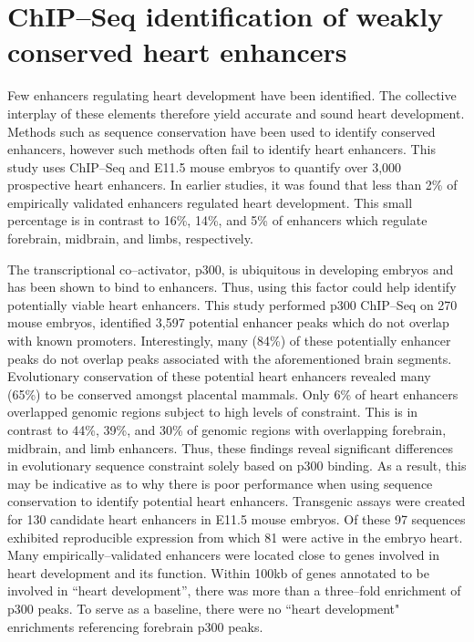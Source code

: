 \documentclass{article}
\begin{document}
	
\section*{ChIP--Seq identification of weakly conserved heart enhancers \cite{blow-naturegen-2010}}
	Few enhancers regulating heart development have been identified. The collective interplay of these
	elements therefore yield accurate and sound heart development. Methods such as sequence conservation have 
	been used to identify conserved enhancers, however such methods often fail to identify heart enhancers.
	This study uses ChIP--Seq and E11.5 mouse embryos to quantify over 3,000 prospective heart enhancers.
	In earlier studies, it was found that less than 2\% of empirically validated enhancers regulated heart development. 
	This small percentage is in contrast to 16\%, 14\%, and 5\% of enhancers which regulate forebrain, midbrain, and
	limbs, respectively.
	
	The transcriptional co--activator, p300, is ubiquitous in developing embryos and has been shown to bind to enhancers.
	Thus, using this factor could help identify potentially viable heart enhancers. This study performed p300 ChIP--Seq on
	270 mouse embryos, identified 3,597 potential enhancer peaks which do not overlap with known promoters.
	Interestingly, many (84\%) of these potentially enhancer peaks do not overlap peaks associated with the aforementioned
	brain segments. Evolutionary conservation of these potential heart enhancers revealed many (65\%) to be conserved amongst placental
	mammals. Only 6\% of heart enhancers overlapped genomic regions subject to high levels of constraint. This is in
	contrast to 44\%, 39\%, and 30\% of genomic regions with overlapping forebrain, midbrain, and limb enhancers.
	Thus, these findings reveal significant differences in evolutionary sequence constraint solely based on 
	p300 binding. As a result, this may be indicative as to why there is poor performance when using sequence conservation
	to identify potential heart enhancers.
	Transgenic assays were created for 130 candidate heart enhancers in E11.5 mouse embryos. Of these 97 sequences exhibited
	reproducible expression from which 81 were active in the embryo heart. Many empirically--validated enhancers were located close to
	genes involved in heart development and its function. Within 100kb of genes annotated to be involved in ``heart development'', there
	was more than a three--fold enrichment of p300 peaks. To serve as a baseline, there were no ``heart development" enrichments referencing 
	forebrain p300 peaks. 
\end{document}
